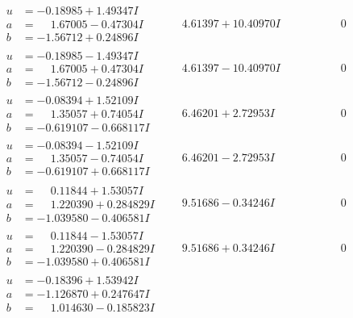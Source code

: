 \documentclass[1p]{elsarticle_modified}
\theoremstyle{definition}
\begin{document}
$$\begin{array}{c|c|c}
\begin{aligned}
u &= -0.18985 + 1.49347 I \\
a &= \phantom{-}1.67005 - 0.47304 I \\
b &= -1.56712 + 0.24896 I\end{aligned}
 & \phantom{-}4.61397 + 10.40970 I & \phantom{-0.000000 } 0 \\ \hline\begin{aligned}
u &= -0.18985 - 1.49347 I \\
a &= \phantom{-}1.67005 + 0.47304 I \\
b &= -1.56712 - 0.24896 I\end{aligned}
 & \phantom{-}4.61397 - 10.40970 I & \phantom{-0.000000 } 0 \\ \hline\begin{aligned}
u &= -0.08394 + 1.52109 I \\
a &= \phantom{-}1.35057 + 0.74054 I \\
b &= -0.619107 - 0.668117 I\end{aligned}
 & \phantom{-}6.46201 + 2.72953 I & \phantom{-0.000000 } 0 \\ \hline\begin{aligned}
u &= -0.08394 - 1.52109 I \\
a &= \phantom{-}1.35057 - 0.74054 I \\
b &= -0.619107 + 0.668117 I\end{aligned}
 & \phantom{-}6.46201 - 2.72953 I & \phantom{-0.000000 } 0 \\ \hline\begin{aligned}
u &= \phantom{-}0.11844 + 1.53057 I \\
a &= \phantom{-}1.220390 + 0.284829 I \\
b &= -1.039580 - 0.406581 I\end{aligned}
 & \phantom{-}9.51686 - 0.34246 I & \phantom{-0.000000 } 0 \\ \hline\begin{aligned}
u &= \phantom{-}0.11844 - 1.53057 I \\
a &= \phantom{-}1.220390 - 0.284829 I \\
b &= -1.039580 + 0.406581 I\end{aligned}
 & \phantom{-}9.51686 + 0.34246 I & \phantom{-0.000000 } 0 \\ \hline\begin{aligned}
u &= -0.18396 + 1.53942 I \\
a &= -1.126870 + 0.247647 I \\
b &= \phantom{-}1.014630 - 0.185823 I\end{aligned}

\end{array}$$
\end{document}

